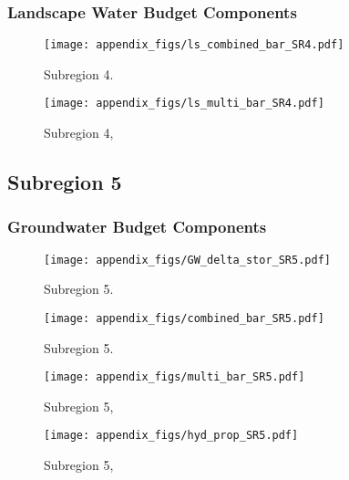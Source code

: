 \subsubsection{Landscape Water Budget Components}
\begin{figure}[ht]
\centerline{\texttt{[image: appendix\_figs/ls\_combined\_bar\_SR4.pdf]}}
\caption{\LSCombinedTextOne Subregion 4.\LSCombinedTextTwo}
\label{fig:LS_budget_SR4}
\end{figure}
\newpage

\begin{landscape}
\begin{figure}[ht]
\centerline{\texttt{[image: appendix\_figs/ls\_multi\_bar\_SR4.pdf]}}
\caption{\LSMultiTextOne Subregion 4,\LSMultiTextTwo}
\label{fig:multi_LS_budget_SR4}
\end{figure}
\newpage
\end{landscape}

\subsection{Subregion 5}
\subsubsection{Groundwater Budget Components}
\begin{figure}[h]
\centerline{\texttt{[image: appendix\_figs/GW\_delta\_stor\_SR5.pdf]}}
\caption{\GWBudgetText Subregion 5.}
\label{fig:delta_stor_SR5}
\end{figure}
\newpage

\begin{figure}[ht]
\centerline{\texttt{[image: appendix\_figs/combined\_bar\_SR5.pdf]}}
\caption{\GWCombinedTextOne Subregion 5.\GWCombinedTextTwo}
\label{fig:GW_budget_SR5}
\end{figure}
\newpage

\begin{landscape}
\begin{figure}[ht]
\centerline{\texttt{[image: appendix\_figs/multi\_bar\_SR5.pdf]}}
\caption{\GWMultiTextOne Subregion 5,\GWMultiTextTwo}
\label{fig:multi_GW_budget_SR5}
\end{figure}
\newpage

\begin{figure}[ht]
\centerline{\texttt{[image: appendix\_figs/hyd\_prop\_SR5.pdf]}}
\caption{\HydPropOne Subregion 5,\HydPropTwo}
\label{fig:hyd_prop_SR5}
\end{figure}
\newpage
\end{landscape}

